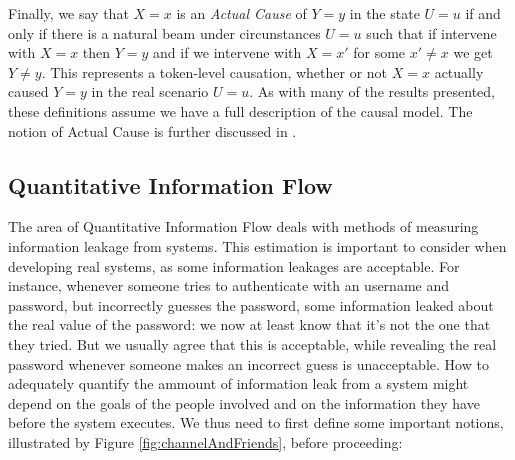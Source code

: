 Finally, we say that $X=x$ is an \emph{Actual Cause} of $Y=y$ in the state $U=u$ if and only if there is a natural beam under circunstances $U=u$ such that if intervene with $X=x$ then $Y=y$ and if we intervene with $X=x'$ for some $x'\neq x$ we get $Y \neq y$. This represents a token-level causation, whether or not $X=x$ actually caused $Y=y$ in the real scenario $U=u$. As with many of the results presented, these definitions assume we have a full description of the causal model. The notion of Actual Cause is further discussed in \cite[Chapter~10]{Causality}.


\subsection{Quantitative Information Flow}

The area of Quantitative Information Flow deals with methods of measuring information leakage from systems. This estimation is important to consider when developing real systems, as some information leakages are acceptable. For instance, whenever someone tries to authenticate with an username and password, but incorrectly guesses the password, some information leaked about the real value of the password: we now at least know that it's not the one that they tried. But we usually agree that this is acceptable, while revealing the real password whenever someone makes an incorrect guess is unacceptable. How to adequately quantify the ammount of information leak from a system might depend on the goals of the people involved and on the information they have before the system executes. We thus need to first define some important notions, illustrated by Figure \ref{fig:channelAndFriends}, before proceeding:


